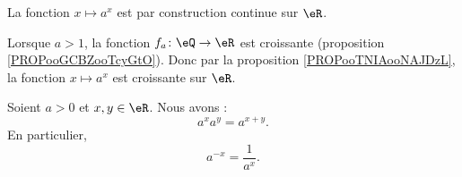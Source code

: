 \begin{normaltext}
    La fonction \( x\mapsto a^x\) est par construction continue sur \( \eR\).

    Lorsque \( a>1\), la fonction \( f_a\colon \eQ\to \eR\) est croissante (proposition \ref{PROPooGCBZooTcyGtO}). Donc par la proposition \ref{PROPooTNIAooNAJDzL}, la fonction \( x\mapsto a^x\) est croissante sur \( \eR\).
\end{normaltext}

\begin{proposition}      \label{PROPooVADRooLCLOzP}
    Soient \( a>0\) et \( x,y\in \eR\). Nous avons :
    \begin{equation}
        a^xa^y=a^{x+y}.
    \end{equation}
    En particulier, 
    \begin{equation}
        a^{-x}=\frac{1}{ a^x }.
    \end{equation}
\end{proposition}


